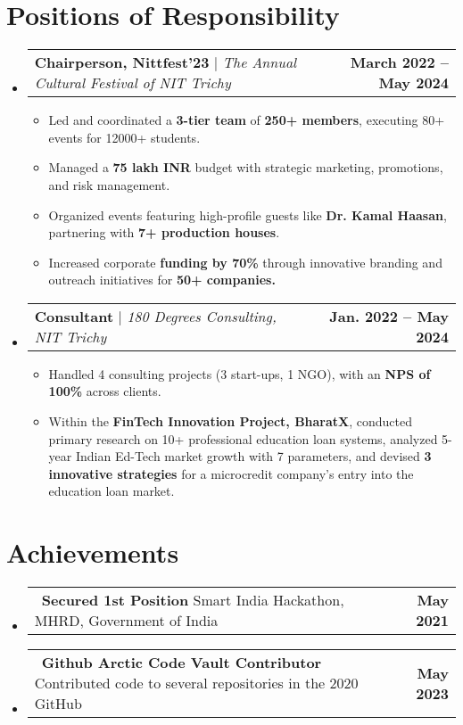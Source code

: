 \documentclass[letterpaper,11pt]{article}
\makeatletter
\newcommand{\resumeProjectHeading}[2]{
    \item
    \begin{tabular*}{0.97\textwidth}{l@{\extracolsep{\fill}}r}
      \small#1 & \textbf{\small#2} \\
    \end{tabular*}\vspace{-7pt}
}
\newcommand{\achievement}[2]{
    \item
    \begin{tabular*}{0.97\textwidth}{l@{\extracolsep{\fill}}r}
      {\small \textbullet\ #1} & \textbf{\small#2} \\
    \end{tabular*}\vspace{-7pt}
}
\newcommand{\resumeItem}[1]{
  \item\small{
    {#1 \vspace{-2pt}}
  }
}
\newcommand{\resumeSubHeadingListStart}{\begin{itemize}[leftmargin=0.15in, label={}]}
\newcommand{\resumeSubHeadingListEnd}{\end{itemize}}
\newcommand{\resumeItemListStart}{\begin{itemize}}
\newcommand{\resumeItemListEnd}{\end{itemize}\vspace{-5pt}}
\makeatother
\begin{document}
\section{Positions of Responsibility}
    \resumeSubHeadingListStart
      \resumeProjectHeading
          {\textbf{Chairperson, Nittfest’23} $|$ \emph{The Annual Cultural Festival of NIT Trichy}}{March 2022 -- May 2024}
          \resumeItemListStart
            \resumeItem{Led and coordinated a \textbf{3-tier team} of \textbf{250+ members}, executing 80+ events for 12000+ students.}
            \resumeItem{Managed a \textbf{75 lakh INR }budget with strategic marketing, promotions, and risk management.}
            \resumeItem{Organized events featuring high-profile guests like \textbf{Dr. Kamal Haasan}, partnering with \textbf{7+ production houses}.}
            \resumeItem{Increased corporate \textbf{funding by 70\%} through innovative branding and outreach initiatives for \textbf{50+ companies.}}
          \resumeItemListEnd

      \resumeProjectHeading
          {\textbf{Consultant} $|$ \emph{180 Degrees Consulting, NIT Trichy}}{Jan. 2022 -- May 2024}
          \resumeItemListStart
            \resumeItem{Handled 4 consulting projects (3 start-ups, 1 NGO), with an \textbf{NPS of 100\%} across clients.}
            \resumeItem{Within the \textbf{FinTech Innovation Project, BharatX}, conducted primary research on 10+ professional education loan systems, analyzed 5-year Indian Ed-Tech market growth with 7 parameters, and devised \textbf{3 innovative strategies} for a microcredit company's entry into the education loan market.}
          \resumeItemListEnd
    \resumeSubHeadingListEnd


\section{Achievements}
    \resumeSubHeadingListStart
        \achievement
        {\textbf{Secured 1st Position} Smart India Hackathon, MHRD, Government of India}{May 2021}
        
        \achievement
        {\textbf{Github Arctic Code Vault Contributor} Contributed code to several repositories in the 2020 GitHub}{May 2023}
    \resumeSubHeadingListEnd


\end{document}
